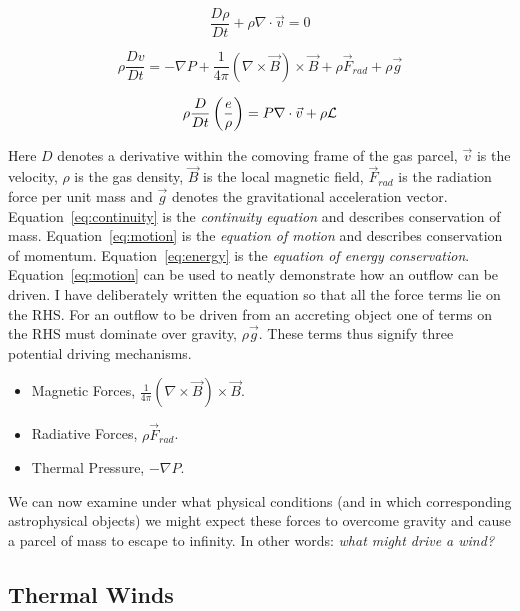 \begin{equation}
\label{eq:continuity}
\frac{D \rho}{Dt} + \rho \nabla \cdot \vec{v} = 0
\end{equation}

\begin{equation}
\label{eq:motion}
\rho \frac{Dv}{Dt} = -\nabla P + \frac{1}{4 \pi}(\nabla \times \vec{B}) \times \vec{B} + \rho \vec{F}_{rad} + \rho \vec{g}
\end{equation}

\begin{equation}
\label{eq:energy}
\rho \frac{D}{Dt} \left(\frac{e}{\rho}\right) = P \nabla \cdot \vec{v} + \rho \cal{L}
\end{equation}

Here $D$ denotes a derivative within the comoving frame of the gas parcel, $\vec{v}$ is the velocity,
$\rho$ is the gas density, $\vec{B}$ is the local magnetic field, $\vec{F}_{rad}$ is the radiation
force per unit mass and $\vec{g}$ denotes the gravitational acceleration vector.
Equation~\ref{eq:continuity} is the {\em continuity equation} and describes conservation of mass. 
Equation~\ref{eq:motion} is the {\em equation of motion} and describes conservation of momentum.
Equation~\ref{eq:energy} is the {\em equation of energy conservation}. 
Equation~\ref{eq:motion} can be used to neatly demonstrate how an outflow can be driven. I have 
deliberately written the equation so that all the force terms lie on the RHS. 
For an outflow to be driven from an accreting object one of terms on the RHS must
dominate over gravity, $\rho \vec{g}$. These terms thus signify three potential
driving mechanisms.

\begin{itemize}
	\item Magnetic Forces, $\frac{1}{4 \pi}(\nabla \times \vec{B}) \times \vec{B}$.
	\item Radiative Forces, $\rho \vec{F}_{rad}$.
	\item Thermal Pressure, $-\nabla P$.
\end{itemize}

We can now examine under what physical conditions 
(and in which corresponding astrophysical objects)
we might expect these forces to overcome gravity and 
cause a parcel of mass to escape to infinity.
In other words: {\em what might drive a wind?}

\subsection{Thermal Winds}

